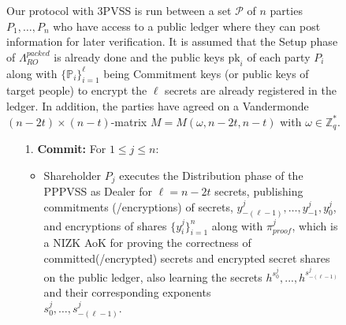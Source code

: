 \begin{figure}[t!]
    \centering
    \begin{tcolorbox}[title=\textbf{Randomness Beacon using 3PVSS, $\Lambda_{RO}^{packed}$}, width=0.9\textwidth, colframe=blue!75!black, colback=blue!10, sharp corners]
        Our protocol with 3PVSS is run between a set $\mathcal{P}$ of $n$ 
        parties $P_1, \dots, P_n$ who have access to a public ledger where they 
        can post information for later verification. It is assumed that the 
        Setup phase of $\Lambda_{RO}^{packed}$ is already done and the public keys 
        $\text{pk}_i$ of each party $P_i$ along with $\{\mathbb{P}_i\}_{i=1}^{\ell}$ 
        being Commitment keys (or public keys of target people) to encrypt the 
        $\ell$ secrets are already registered in the ledger. In addition, the 
        parties have agreed on a Vandermonde $(n - 2t) \times (n - t)$-matrix 
        $M = M(\omega, n - 2t, n - t)$ with $\omega \in \mathbb{Z}_q^*$.

    \begin{enumerate}
        \item [1.]\textbf{Commit:} For $1 \leq j \leq n$:
        \begin{itemize}
            \item Shareholder $P_j$ executes the Distribution phase of the 
            PPPVSS as Dealer for $\ell = n - 2t$ secrets, publishing commitments 
            (/encryptions) of secrets, $y_{-(\ell-1)}^j, \dots, y_{-1}^j, y_0^j$, 
            and encryptions of shares $\{y_i^j\}_{i=1}^n$ along with 
            $\pi_{proof}^{j}$, which is a NIZK AoK for proving the correctness of 
            committed(/encrypted) secrets and encrypted secret shares on the 
            public ledger, also learning the secrets $h^{s_0^j},...,h^{s_{-(\ell-1)}^j}$ 
            and their corresponding exponents\\ $s_0^j, \dots, s_{-(\ell-1)}^j$.
        \end{itemize}
        

\end{enumerate}
\end{tcolorbox}
\end{figure}
